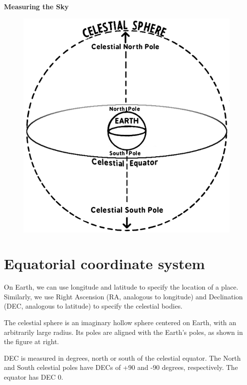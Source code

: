 \documentclass[10pt]{article}%
\begin{document}
\begin{center}

\huge\textbf{Measuring the Sky}
\end{center}

\begin{figure}
\vspace{-10pt}
\includegraphics[scale=.32]{Celestial_sphere.png}
\vspace{-10pt}
\end{figure}

\section{Equatorial coordinate system}

On Earth, we can use longitude and latitude to specify the location of a place. Similarly, we use Right Ascension (RA, analogous to longitude) and Declination (DEC, analogous to latitude) to specify the celestial bodies. 

The celestial sphere is an imaginary hollow sphere centered on Earth, with an arbitrarily large radius. Its poles are aligned with the Earth's poles, as shown in the figure at right. 

DEC is measured in degrees, north or south of the celestial equator. The North and South celestial poles have DECs of +90 and -90 degrees, respectively. The equator has DEC 0.
\end{document}
